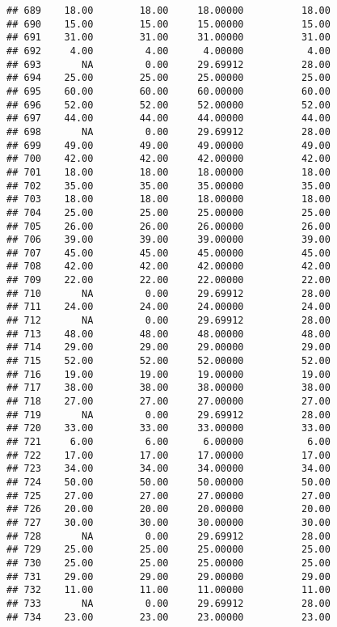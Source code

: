 \documentclass[
]{article}
\begin{document}
\begin{verbatim}
## 689    18.00        18.00     18.00000          18.00
## 690    15.00        15.00     15.00000          15.00
## 691    31.00        31.00     31.00000          31.00
## 692     4.00         4.00      4.00000           4.00
## 693       NA         0.00     29.69912          28.00
## 694    25.00        25.00     25.00000          25.00
## 695    60.00        60.00     60.00000          60.00
## 696    52.00        52.00     52.00000          52.00
## 697    44.00        44.00     44.00000          44.00
## 698       NA         0.00     29.69912          28.00
## 699    49.00        49.00     49.00000          49.00
## 700    42.00        42.00     42.00000          42.00
## 701    18.00        18.00     18.00000          18.00
## 702    35.00        35.00     35.00000          35.00
## 703    18.00        18.00     18.00000          18.00
## 704    25.00        25.00     25.00000          25.00
## 705    26.00        26.00     26.00000          26.00
## 706    39.00        39.00     39.00000          39.00
## 707    45.00        45.00     45.00000          45.00
## 708    42.00        42.00     42.00000          42.00
## 709    22.00        22.00     22.00000          22.00
## 710       NA         0.00     29.69912          28.00
## 711    24.00        24.00     24.00000          24.00
## 712       NA         0.00     29.69912          28.00
## 713    48.00        48.00     48.00000          48.00
## 714    29.00        29.00     29.00000          29.00
## 715    52.00        52.00     52.00000          52.00
## 716    19.00        19.00     19.00000          19.00
## 717    38.00        38.00     38.00000          38.00
## 718    27.00        27.00     27.00000          27.00
## 719       NA         0.00     29.69912          28.00
## 720    33.00        33.00     33.00000          33.00
## 721     6.00         6.00      6.00000           6.00
## 722    17.00        17.00     17.00000          17.00
## 723    34.00        34.00     34.00000          34.00
## 724    50.00        50.00     50.00000          50.00
## 725    27.00        27.00     27.00000          27.00
## 726    20.00        20.00     20.00000          20.00
## 727    30.00        30.00     30.00000          30.00
## 728       NA         0.00     29.69912          28.00
## 729    25.00        25.00     25.00000          25.00
## 730    25.00        25.00     25.00000          25.00
## 731    29.00        29.00     29.00000          29.00
## 732    11.00        11.00     11.00000          11.00
## 733       NA         0.00     29.69912          28.00
## 734    23.00        23.00     23.00000          23.00

\end{verbatim}
\end{document}
